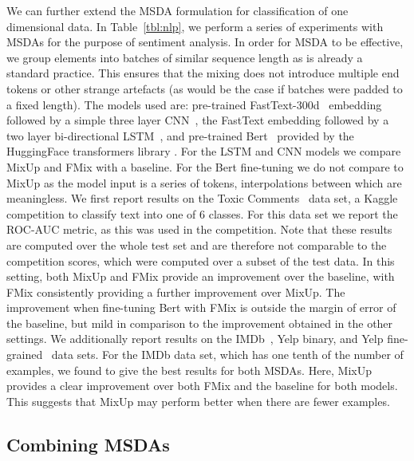 \documentclass[journal]{IEEEtran}
\newcommand{\fmix}{FMix\xspace}
\newcommand{\mixup}{MixUp\xspace}
\begin{document}
We can further extend the MSDA formulation for classification of one dimensional data. In Table~\ref{tbl:nlp}, we perform a series of experiments with MSDAs for the purpose of sentiment analysis. In order for MSDA to be effective, we group elements into batches of similar sequence length as is already a standard practice. This ensures that the mixing does not introduce multiple end tokens or other strange artefacts (as would be the case if batches were padded to a fixed length). The models used are: pre-trained FastText-300d~\citep{joulin2016bag} embedding followed by a simple three layer CNN~\citep{lecun1995convolutional}, the FastText embedding followed by a two layer bi-directional LSTM~\citep{hochreiter1997long}, and pre-trained Bert~\citep{devlin2018bert} provided by the HuggingFace transformers library \citep{Wolf2019HuggingFacesTS}. For the LSTM and CNN models we compare \mixup and \fmix with a baseline. For the Bert fine-tuning we do not compare to \mixup as the model input is a series of tokens, interpolations between which are meaningless. We first report results on the Toxic Comments~\citep{toxic} data set, a Kaggle competition to classify text into one of 6 classes. For this data set we report the ROC-AUC metric, as this was used in the competition. Note that these results are computed over the whole test set and are therefore not comparable to the competition scores, which were computed over a subset of the test data. In this setting, both \mixup and \fmix provide an improvement over the baseline, with \fmix consistently providing a further improvement over \mixup. The improvement when fine-tuning Bert with \fmix is outside the margin of error of the baseline, but mild in comparison to the improvement obtained in the other settings. We additionally report results on the IMDb~\citep{maas2011learning}, Yelp binary, and Yelp fine-grained~\citep{zhang2015character} data sets. For the IMDb data set, which has one tenth of the number of examples, we found  to give the best results for both MSDAs. Here, \mixup provides a clear improvement over both \fmix and the baseline for both models. This suggests that \mixup may perform better when there are fewer examples.








\subsection{Combining MSDAs}
\end{document}
